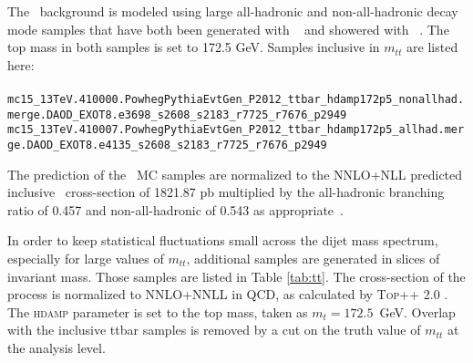 

The \ttbar\ background is modeled using large all-hadronic and non-all-hadronic decay mode samples that have both been generated with \Powheg~\cite{powheg} and showered with \Pythia~\cite{pythia8}. The top mass in both samples is set to 172.5 GeV. Samples inclusive in $m_{tt}$ are listed here:
\\ \\
\noindent
{\scriptsize
\verb|mc15_13TeV.410000.PowhegPythiaEvtGen_P2012_ttbar_hdamp172p5_nonallhad.merge.DAOD_EXOT8.e3698_s2608_s2183_r7725_r7676_p2949|\\
\verb|mc15_13TeV.410007.PowhegPythiaEvtGen_P2012_ttbar_hdamp172p5_allhad.merge.DAOD_EXOT8.e4135_s2608_s2183_r7725_r7676_p2949|
}

The prediction of the \ttbar\ MC samples are normalized to the NNLO+NLL predicted inclusive \ttbar\ cross-section of
1821.87 pb multiplied by the all-hadronic branching ratio of 0.457 and non-all-hadronic of 0.543 as appropriate~\cite{TTbarXSec}. 

In order to keep statistical fluctuations small across the dijet mass spectrum, especially for large values of $m_{tt}$, additional \ttbar samples are generated in slices of \ttbar invariant mass. Those samples are listed in Table \ref{tab:tt}. The cross-section of the \ttbar process is normalized to NNLO+NNLL in QCD, as calculated by \textsc{Top++} 2.0 \cite{Czakon:2011xx}. The \POWHEG \textsc{hdamp} parameter \cite{ATL-PHYS-PUB-2014-005} is set to the top mass, taken as $m_{t} = 172.5$~GeV. Overlap with the inclusive ttbar samples is removed by a cut on the truth value of $m_{tt}$ at the analysis level.
 
